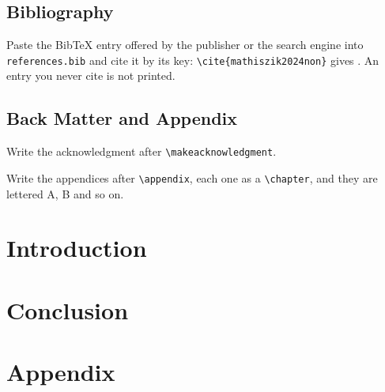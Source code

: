\documentclass[lang=en]{ftmthesis}
\begin{document}
\section{Bibliography}
Paste the BibTeX entry offered by the publisher or the search engine into \texttt{references.bib} and cite it by its key: \verb|\cite{mathiszik2024non}| gives \cite{mathiszik2024non}.
An entry you never cite is not printed.

\section{Back Matter and Appendix}
Write the acknowledgment after \verb|\makeacknowledgment|.

Write the appendices after \verb|\appendix|, each one as a \verb|\chapter|, and they are lettered A, B and so on.

\chapter{Introduction}
\label{chap:introduction}
\blindtext

\chapter{Conclusion}
\label{chap:conclusion}
\blindtext

\small
\printbibliography
\normalsize

\makeacknowledgment
\blindtext

\appendix
\chapter{Appendix}
\label{sec:appendix}
\blindtext
\end{document}
